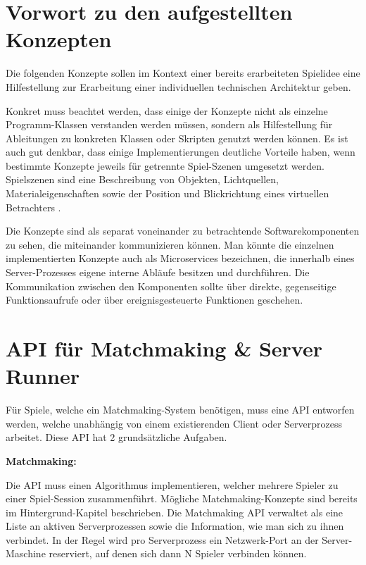 \section{Vorwort zu den aufgestellten Konzepten}

Die folgenden Konzepte sollen im Kontext einer bereits erarbeiteten Spielidee eine Hilfestellung zur Erarbeitung einer individuellen technischen Architektur geben.

Konkret muss beachtet werden, dass einige der Konzepte nicht als einzelne Programm-Klassen verstanden werden müssen, sondern als Hilfestellung für Ableitungen zu konkreten Klassen oder Skripten genutzt werden können. Es ist auch gut denkbar, dass einige Implementierungen deutliche Vorteile haben, wenn bestimmte Konzepte jeweils für getrennte Spiel-Szenen umgesetzt werden. Spielszenen sind eine Beschreibung von Objekten, Lichtquellen, Materialeigenschaften sowie der Position und Blickrichtung eines virtuellen Betrachters \cite{Wikipedia.2012}.

Die Konzepte sind als separat voneinander zu betrachtende Softwarekomponenten zu sehen, die miteinander kommunizieren können. Man könnte die einzelnen implementierten Konzepte auch als Microservices \cite{Thones.2015} bezeichnen, die innerhalb eines Server-Prozesses eigene interne Abläufe besitzen und durchführen. Die Kommunikation zwischen den Komponenten sollte über direkte, gegenseitige Funktionsaufrufe oder über ereignisgesteuerte Funktionen \cite{Michelson.2006} geschehen.

\section{API für Matchmaking \& Server Runner}

Für Spiele, welche ein Matchmaking-System benötigen, muss eine API entworfen werden, welche unabhängig von einem existierenden Client oder Serverprozess arbeitet. Diese API hat 2 grundsätzliche Aufgaben. 

\textbf{Matchmaking:}

Die API muss einen Algorithmus implementieren, welcher mehrere Spieler zu einer Spiel-Session zusammenführt. Mögliche Matchmaking-Konzepte sind bereits im Hintergrund-Kapitel beschrieben. Die Matchmaking API verwaltet als eine Liste an aktiven Serverprozessen sowie die Information, wie man sich zu ihnen verbindet. In der Regel wird pro Serverprozess ein Netzwerk-Port an der Server-Maschine reserviert, auf denen sich dann N Spieler verbinden können.

